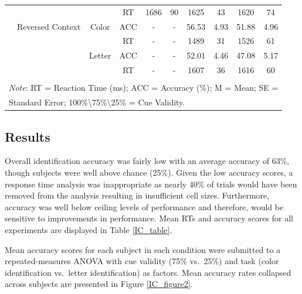 \documentclass[]{DissertateCUNY}
\begin{document}
\begin{table}[htbp]
\begin{tabular}{cccccccccc}
& & & \multicolumn{1}{c}{RT} & \multicolumn{1}{c}{1686} & \multicolumn{1}{c}{90} & \multicolumn{1}{c}{1625} & \multicolumn{1}{c}{43} & \multicolumn{1}{c}{1620} & \multicolumn{1}{c}{74} \\
\cmidrule(rl){3-10}
& \multicolumn{1}{l}{Reversed Context} & \multicolumn{1}{c}{Color} & \multicolumn{1}{c}{ACC} & \multicolumn{1}{c}{-} & \multicolumn{1}{c}{-} & \multicolumn{1}{c}{56.53} & \multicolumn{1}{c}{4.93} & \multicolumn{1}{c}{51.88} & \multicolumn{1}{c}{4.96} \\
& & & \multicolumn{1}{c}{RT} & \multicolumn{1}{c}{-} & \multicolumn{1}{c}{-} & \multicolumn{1}{c}{1489} & \multicolumn{1}{c}{31} & \multicolumn{1}{c}{1526} & \multicolumn{1}{c}{61} \\
& & \multicolumn{1}{c}{Letter} & \multicolumn{1}{c}{ACC} & \multicolumn{1}{c}{-} & \multicolumn{1}{c}{-} & \multicolumn{1}{c}{52.01} & \multicolumn{1}{c}{4.46} & \multicolumn{1}{c}{47.08} & \multicolumn{1}{c}{5.17} \\
& & & \multicolumn{1}{c}{RT} & \multicolumn{1}{c}{-} & \multicolumn{1}{c}{-} & \multicolumn{1}{c}{1607} & \multicolumn{1}{c}{36} & \multicolumn{1}{c}{1616} & \multicolumn{1}{c}{60} \\
 & & & & & & & & & \\
\bottomrule
\multicolumn{10}{l}{\textit{Note}: RT = Reaction Time (ms);  ACC = Accuracy (\%);  M = Mean; SE = } \\
\multicolumn{10}{l}{Standard Error;  100\%\textbackslash 75\%\textbackslash 25\% = Cue Validity.} \\
\end{tabular}%
\end{table}

\hypertarget{results}{%
\subsection{Results}\label{results}}

Overall identification accuracy was fairly low with an average accuracy
of 63\%, though subjects were well above chance (25\%). Given the low
accuracy scores, a response time analysis was inappropriate as nearly
40\% of trials would have been removed from the analysis resulting in
insufficient cell sizes. Furthermore, accuracy was well below ceiling
levels of performance and therefore, would be sensitive to improvements
in performance. Mean RTs and accuracy scores for all experiments are
displayed in Table \ref{IC_table}.

Mean accuracy scores for each subject in each condition were submitted
to a repeated-measures ANOVA with cue validity (75\% vs.~25\%) and task
(color identification vs.~letter identification) as factors. Mean
accuracy rates collapsed across subjects are presented in Figure
\ref{IC_figure2}.
\end{document}

